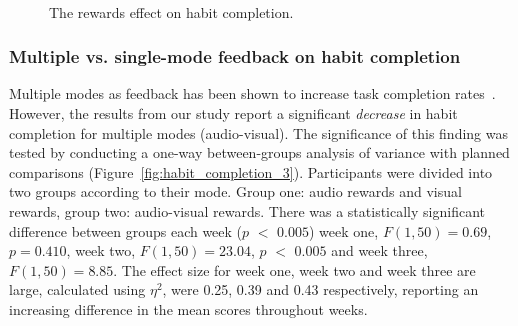 \documentclass{scaffold/sigchi}
\begin{document}
\begin{figure}
  \centering
  \caption{The rewards effect on habit completion.}~\label{fig:habit_completion_2}
\end{figure}


\subsubsection{Multiple vs. single-mode feedback on habit completion}
Multiple modes as feedback has been shown to increase task completion rates~\cite{comparing_modalities_effects_of_visual_auditory, benefits_of_audio_visual_1, benefits_of_audio_visual_2}. However, the results from our study report a significant \textit{decrease} in habit completion for multiple modes (audio-visual). The significance of this finding was tested by conducting a one-way between-groups analysis of variance with planned comparisons (Figure~\ref{fig:habit_completion_3}). Participants were divided into two groups according to their mode. Group one: audio rewards and visual rewards, group two: audio-visual rewards. There was a statistically significant difference between groups each week ($p$ $<$ $0.005$) week one, $F(1,50) = 0.69$, $p = 0.410$, week two, $F(1,50) = 23.04$, $p$ $<$ $0.005$ and week three, $F(1,50) = 8.85$. The effect size for week one, week two and week three are large, calculated using $\eta^{2}$, were 0.25, 0.39 and 0.43 respectively, reporting an increasing difference in the mean scores throughout weeks.
\end{document}

